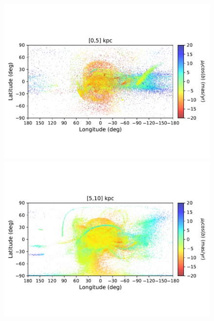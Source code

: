 \begin{figure}[h!]
\begin{center}
            \includegraphics[clip=true, trim = 0mm 20mm 0mm 20mm, width=0.9\columnwidth]{images/PII_ensemble_LB_D0-5_PML_new.pdf}
            \includegraphics[clip=true, trim = 0mm 20mm 0mm 20mm, width=0.9\columnwidth]{images/PII_ensemble_LB_D5-10_PML_new.pdf}


\end{center}
\end{figure}

